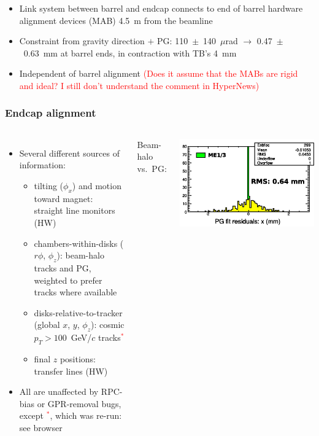 \documentclass[compress]{beamer}
\begin{document}
\begin{frame}
\vfill
\begin{itemize}
\item Link system between barrel and endcap connects to end of barrel hardware alignment devices (MAB) 4.5~m from the beamline
\item Constraint from gravity direction $+$ PG: \mbox{110 $\pm$ 140~$\mu$rad} $\to$ \mbox{0.47 $\pm$ 0.63~mm} at barrel ends, in contraction with TB's 4~mm
\item Independent of barrel alignment \textcolor{red}{\scriptsize (Does it assume that the MABs are rigid and ideal?  I still don't understand the comment in HyperNews)}
\end{itemize}
\end{frame}

\begin{frame}
\frametitle{Endcap alignment}

\begin{columns}
\begin{itemize}
\item Several different sources of information:
\begin{itemize}
\item tilting ($\phi_x$) and motion toward magnet: straight line monitors (HW)
\item chambers-within-disks ($r\phi$, $\phi_z$): beam-halo tracks and
PG, weighted to prefer tracks where available
\item disks-relative-to-tracker (global $x$, $y$, $\phi_z$): cosmic
$p_T > 100$~GeV/$c$ tracks\textcolor{red}{$^*$}
\item final $z$ positions: transfer lines (HW)
\end{itemize}
\item All are unaffected by RPC-bias or GPR-removal bugs, except \textcolor{red}{$^*$},
which was re-run: see browser
\end{itemize}

Beam-halo vs.\ PG:

\includegraphics[width=\linewidth]{beamhalo-PG.png}


\end{columns}
\end{frame}
\end{document}
